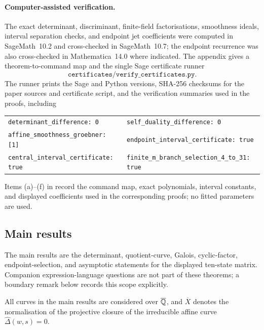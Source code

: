 \paragraph{Computer-assisted verification.}
The exact determinant, discriminant, finite-field factorisations,
smoothness ideals, interval separation checks, and endpoint jet
coefficients were computed in SageMath~10.2 and cross-checked in
SageMath~10.7; the endpoint recurrence was also cross-checked in
Mathematica~14.0 where indicated.  The appendix gives a
theorem-to-command map and the single Sage certificate runner
\[
  \texttt{certificates/verify\_certificates.py}.
\]
The runner prints the Sage and Python versions, SHA-256 checksums for
the paper sources and certificate script, and the verification summaries
used in the proofs, including
\begin{center}
\small
\begin{tabularx}{\textwidth}{@{}XX@{}}
\texttt{determinant\_difference: 0} &
\texttt{self\_duality\_difference: 0}\\
\texttt{affine\_smoothness\_groebner: [1]} &
\texttt{endpoint\_interval\_certificate: true}\\
\texttt{central\_interval\_certificate: true} &
\texttt{finite\_m\_branch\_selection\_4\_to\_31: true}
\end{tabularx}
\end{center}
Items \textup{(a)}--\textup{(f)} in 
record the command map, exact polynomials, interval constants, and
displayed coefficients used in the corresponding proofs; no fitted
parameters are used.


\subsection{Main results}

The main results are the determinant, quotient-curve, Galois,
cyclic-factor, endpoint-selection, and asymptotic statements for the
displayed ten-state matrix.  Companion expression-language questions
are not part of these theorems; a boundary remark below records this
scope explicitly.

All curves in the main results are considered over \(\overline{\mathbb{Q}}\), and
\(\overline{X}\) denotes the normalisation of the projective closure of
the irreducible affine curve \(\widehat\Delta(w,s)=0\).

